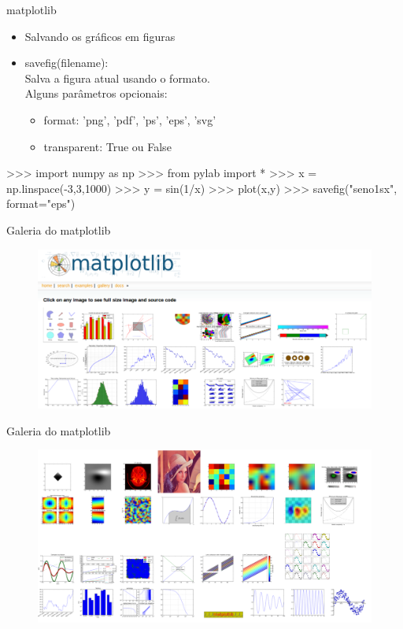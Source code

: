 \documentclass[12pt,t,graphics]{beamer}
\begin{document}
\begin{frame}[t,fragile]{matplotlib}
	\begin{itemize}
		\item Salvando os gráficos em figuras
		\item savefig(filename):\\
		Salva a figura atual usando o formato.\\
		Alguns parâmetros opcionais:
		\begin{itemize}
			\item format: 'png', 'pdf', 'ps', 'eps', 'svg'
			\item transparent: True ou False
		\end{itemize}
	\end{itemize}
	\begin{python}
	>>> import numpy as np
	>>> from pylab import *
	>>> x = np.linspace(-3,3,1000)
	>>> y = sin(1/x)
	>>> plot(x,y)
	>>> savefig("seno1sx", format="eps")
	\end{python}
\end{frame}

\begin{frame}[t,fragile]{Galeria do matplotlib}
	\begin{figure}
		\centering
		\includegraphics[scale=0.3]{img/matplot1.png}
	\end{figure}
\end{frame}

\begin{frame}[t,fragile]{Galeria do matplotlib}
	\begin{figure}
		\centering
		\includegraphics[scale=0.3]{img/matplot2.png}
	\end{figure}
\end{frame}
\end{document}
